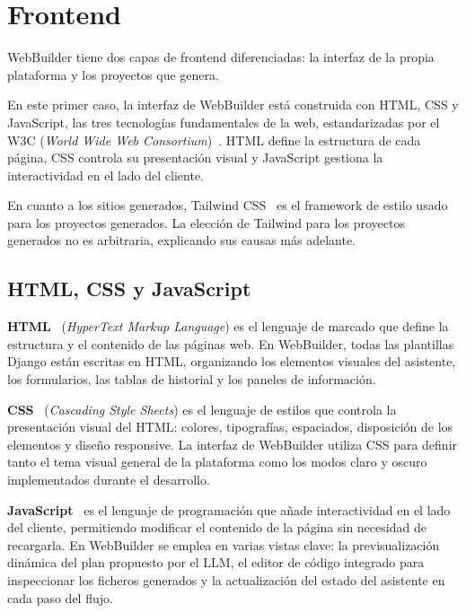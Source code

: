 \section{Frontend}
\label{sec:frontend}

WebBuilder tiene dos capas de frontend diferenciadas: la interfaz de la propia 
plataforma y los proyectos que genera.

En este primer caso, la interfaz de WebBuilder está construida con HTML, CSS y 
JavaScript, las tres tecnologías fundamentales de la web, estandarizadas por el 
W3C (\emph{World Wide Web Consortium})~\cite{w3c}. HTML define la estructura de 
cada página, CSS controla su presentación visual y JavaScript gestiona la 
interactividad en el lado del cliente.

En cuanto a los sitios generados, Tailwind CSS~\cite{tailwind_docs} es el framework de estilo usado para los proyectos generados. La elección de Tailwind para los proyectos generados no es arbitraria, explicando sus causas más adelante.


\subsection{HTML, CSS y JavaScript}
\label{subsec:htmlcssjs}

\textbf{HTML}~\cite{mdn_html} (\emph{HyperText Markup Language}) es el lenguaje de marcado que define la estructura y el contenido de las páginas web. En WebBuilder, todas las plantillas Django están escritas en HTML, organizando los elementos visuales del asistente, los formularios, las tablas de historial y los paneles de información.

\textbf{CSS}~\cite{mdn_css} (\emph{Cascading Style Sheets}) es el lenguaje de estilos que controla la presentación visual del HTML: colores, tipografías, espaciados,  disposición de los elementos y diseño responsive. La interfaz de WebBuilder utiliza CSS para definir tanto el tema visual general de la plataforma como los modos claro y oscuro implementados durante el desarrollo.

\textbf{JavaScript}~\cite{mdn_javascript} es el lenguaje de programación que añade interactividad en el lado del cliente, permitiendo modificar el contenido de la página sin necesidad de recargarla. En WebBuilder se emplea en varias vistas clave: la previsualización dinámica del plan propuesto por el LLM, el editor de código integrado para inspeccionar los ficheros generados y la actualización del estado del asistente en cada paso del flujo.



